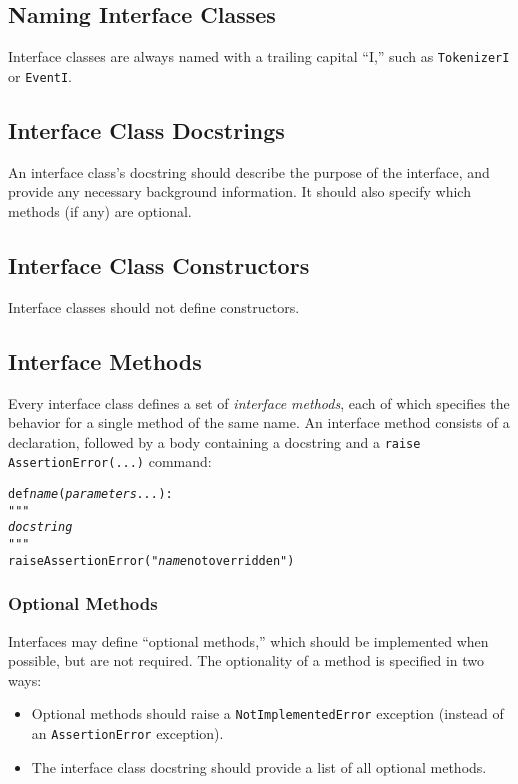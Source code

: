 \documentclass[11pt]{article}
\begin{document}
\subsection{Naming Interface Classes}

Interface classes are always named with a trailing capital ``I,'' such
as \texttt{TokenizerI} or \texttt{EventI}.

\subsection{Interface Class Docstrings}

An interface class's docstring should describe the purpose of the
interface, and provide any necessary background information.  It
should also specify which methods (if any) are optional.

\subsection{Interface Class Constructors}

Interface classes should not define constructors.

\subsection{Interface Methods}

Every interface class defines a set of \textit{interface methods},
each of which specifies the behavior for a single method of the same
name.  An interface method consists of a declaration, followed by a
body containing a docstring and a \texttt{raise AssertionError(...)}
command:

\begin{alltt}
    def \textit{name}(\textit{parameters...}):
        """
        \textit{docstring}
        """
        raise AssertionError("\textit{name} not overridden")
\end{alltt}

\subsubsection{Optional Methods}

Interfaces may define ``optional methods,'' which should be
implemented when possible, but are not required.  The optionality of a
method is specified in two ways:

\begin{itemize}
\item Optional methods should raise a \texttt{NotImplementedError}
  exception (instead of an \texttt{AssertionError} exception).
\item The interface class docstring should provide a list of all
  optional methods.
\end{itemize}
\end{document}
